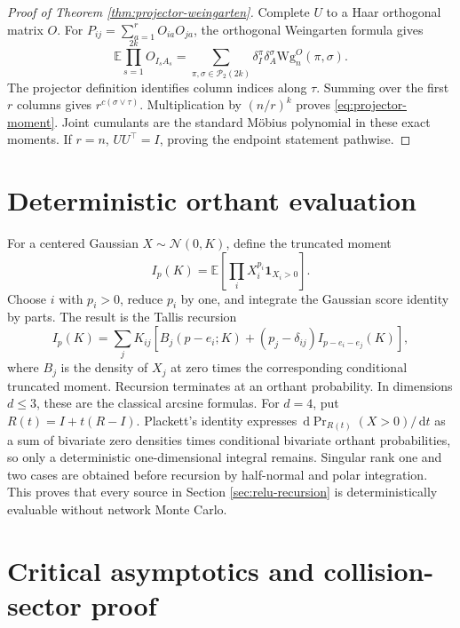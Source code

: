 \documentclass{article}
\newcommand{\E}{\mathbb E}
\newcommand{\cP}{\mathcal P}
\newcommand{\dd}{\,\mathrm d}
\newcommand{\ind}{\mathbf 1}
\begin{document}
\begin{proof}[Proof of Theorem \ref{thm:projector-weingarten}]
Complete \(U\) to a Haar orthogonal matrix \(O\).  For
\(P_{ij}=\sum_{a=1}^rO_{ia}O_{ja}\), the orthogonal Weingarten formula gives
\begin{equation}
\E\prod_{s=1}^{2k}O_{I_sA_s}
=\sum_{\pi,\sigma\in\cP_2(2k)}
\delta_I^\pi\delta_A^\sigma
\mathrm{Wg}^{O}_n(\pi,\sigma).
\end{equation}
The projector definition identifies column indices along \(\tau\).  Summing
over the first \(r\) columns gives
\(r^{c(\sigma\vee\tau)}\).  Multiplication by \((n/r)^k\) proves
\eqref{eq:projector-moment}.  Joint cumulants are the standard M\"obius
polynomial in these exact moments.  If \(r=n\), \(UU^\top=I\), proving the
endpoint statement pathwise.
\end{proof}

\section{Deterministic orthant evaluation}
\label{app:orthant}

For a centered Gaussian \(X\sim\mathcal N(0,K)\), define the truncated moment
\begin{equation}
I_p(K)=\E\left[\prod_iX_i^{p_i}\ind_{X_i>0}\right].
\end{equation}
Choose \(i\) with \(p_i>0\), reduce \(p_i\) by one, and integrate the Gaussian
score identity by parts.  The result is the Tallis recursion
\begin{equation}
I_p(K)=\sum_jK_{ij}
\left[B_j(p-e_i;K)+(p_j-\delta_{ij})I_{p-e_i-e_j}(K)\right],
\label{eq:tallis}
\end{equation}
where \(B_j\) is the density of \(X_j\) at zero times the corresponding
conditional truncated moment.  Recursion terminates at an orthant
probability.  In dimensions \(d\le3\), these are the classical arcsine
formulas.  For \(d=4\), put \(R(t)=I+t(R-I)\).  Plackett's identity expresses
\(\dd\Pr_{R(t)}(X>0)/\dd t\) as a sum of bivariate zero densities times
conditional bivariate orthant probabilities, so only a deterministic
one-dimensional integral remains.  Singular rank one and two cases are
obtained before recursion by half-normal and polar integration.  This proves
that every source in Section \ref{sec:relu-recursion} is deterministically
evaluable without network Monte Carlo.

\section{Critical asymptotics and collision-sector proof}
\label{app:depth-proof}
\end{document}

